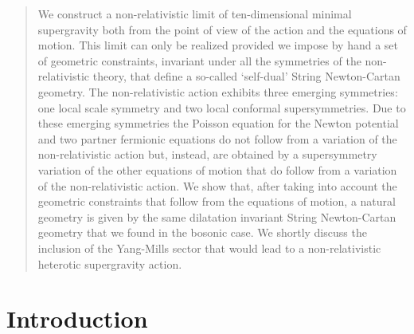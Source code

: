 \documentclass[a4paper,10pt,openany]{article}
\begin{document}
	\begin{quotation}
		{\small
			We construct a  non-relativistic limit of ten-dimensional minimal supergravity both from the point of view of the action and the equations of motion.
			This limit can only be realized provided we impose by hand a set of geometric constraints, invariant under all the symmetries of the non-relativistic theory, that define a so-called `self-dual' String Newton-Cartan geometry. The non-relativistic action exhibits three emerging symmetries: one local scale symmetry and two local conformal supersymmetries. Due to these emerging symmetries the Poisson equation for the Newton potential and two partner fermionic equations do not follow from a variation of the non-relativistic action but, instead, are obtained by a supersymmetry variation of the other equations of motion that do follow from a variation of the non-relativistic action. We show that, after taking into account the geometric constraints that follow from the equations of motion, a natural geometry is given by the same dilatation invariant String Newton-Cartan geometry that we found in the bosonic case. We shortly discuss the inclusion of the Yang-Mills sector that would lead to a non-relativistic heterotic supergravity action.
		}
	\end{quotation}
	
	
	
	\newpage
	
	\tableofcontents
	
	\section{Introduction}\label{sec:intro}
	
\end{document}
